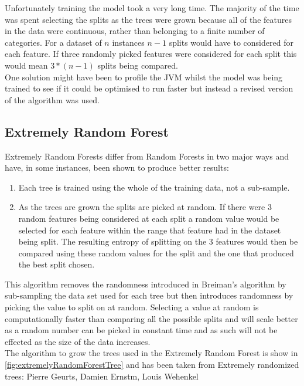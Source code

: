 		Unfortunately training the model took a very long time. The majority of the time was spent selecting the splits as the trees were grown because all of the features in the data were continuous, rather than belonging to a finite number of categories. For a dataset of $n$ instances $n - 1$ splits would have to considered for each feature. If three randomly picked features were considered for each split this would mean $3 * (n - 1)$ splits being compared.\\ 
		
		One solution might have been to profile the JVM whilst the model was being trained to see if it could be optimised to run faster but instead a revised version of the algorithm was used.
		\subsection{Extremely Random Forest}
			Extremely Random Forests differ from Random Forests in two major ways and have, in some instances, been shown to produce better results\cite{geurts2006extremely}:
			
			\begin{enumerate}
				\item Each tree is trained using the whole of the training data, not a sub-sample.
				\item As the trees are grown the splits are picked at random. If there were 3 random features being considered at each split a random value would be selected for each feature within the range that feature had in the dataset being split. The resulting entropy of splitting on the 3 features would then be compared using these random values for the split and the one that produced the best split chosen.
			\end{enumerate}
			
			This algorithm removes the randomness introduced in Breiman's algorithm by sub-sampling the data set used for each tree but then introduces randomness by picking the value to split on at random. Selecting a value at random is computationally faster than comparing all the possible splits and will scale better as a random number can be picked in constant time and as such will not be effected as the size of the data increases.\\
		
		The algorithm to grow the trees used in the Extremely Random Forest is show in \ref{fig:extremelyRandomForestTree} and has been taken from Extremely randomized trees: Pierre Geurts, Damien Ernstm, Louis Wehenkel\cite{geurts2006extremely}
		
